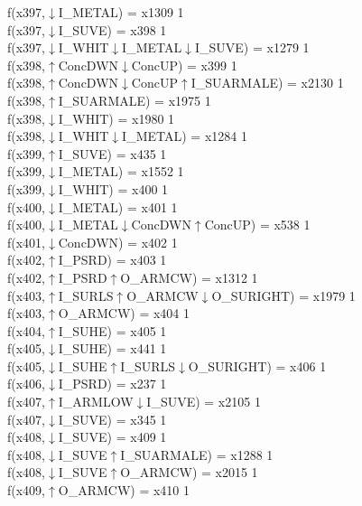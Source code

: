 f(x397,$\downarrow$I\_METAL) = x1309 {1} \\
f(x397,$\downarrow$I\_SUVE) = x398 {1} \\
f(x397,$\downarrow$I\_WHIT$\downarrow$I\_METAL$\downarrow$I\_SUVE) = x1279 {1} \\
f(x398,$\uparrow$ConcDWN$\downarrow$ConcUP) = x399 {1} \\
f(x398,$\uparrow$ConcDWN$\downarrow$ConcUP$\uparrow$I\_SUARMALE) = x2130 {1} \\
f(x398,$\uparrow$I\_SUARMALE) = x1975 {1} \\
f(x398,$\downarrow$I\_WHIT) = x1980 {1} \\
f(x398,$\downarrow$I\_WHIT$\downarrow$I\_METAL) = x1284 {1} \\
f(x399,$\uparrow$I\_SUVE) = x435 {1} \\
f(x399,$\downarrow$I\_METAL) = x1552 {1} \\
f(x399,$\downarrow$I\_WHIT) = x400 {1} \\
f(x400,$\downarrow$I\_METAL) = x401 {1} \\
f(x400,$\downarrow$I\_METAL$\downarrow$ConcDWN$\uparrow$ConcUP) = x538 {1} \\
f(x401,$\downarrow$ConcDWN) = x402 {1} \\
f(x402,$\uparrow$I\_PSRD) = x403 {1} \\
f(x402,$\uparrow$I\_PSRD$\uparrow$O\_ARMCW) = x1312 {1} \\
f(x403,$\uparrow$I\_SURLS$\uparrow$O\_ARMCW$\downarrow$O\_SURIGHT) = x1979 {1} \\
f(x403,$\uparrow$O\_ARMCW) = x404 {1} \\
f(x404,$\uparrow$I\_SUHE) = x405 {1} \\
f(x405,$\downarrow$I\_SUHE) = x441 {1} \\
f(x405,$\downarrow$I\_SUHE$\uparrow$I\_SURLS$\downarrow$O\_SURIGHT) = x406 {1} \\
f(x406,$\downarrow$I\_PSRD) = x237 {1} \\
f(x407,$\uparrow$I\_ARMLOW$\downarrow$I\_SUVE) = x2105 {1} \\
f(x407,$\downarrow$I\_SUVE) = x345 {1} \\
f(x408,$\downarrow$I\_SUVE) = x409 {1} \\
f(x408,$\downarrow$I\_SUVE$\uparrow$I\_SUARMALE) = x1288 {1} \\
f(x408,$\downarrow$I\_SUVE$\uparrow$O\_ARMCW) = x2015 {1} \\
f(x409,$\uparrow$O\_ARMCW) = x410 {1} \\
